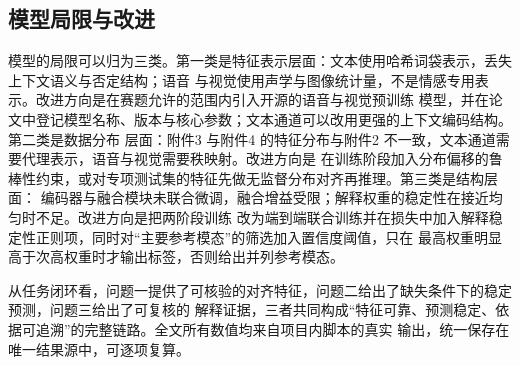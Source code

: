 \documentclass[bwprint]{gmcmthesis}
\begin{document}
\subsection{模型局限与改进}

模型的局限可以归为三类。第一类是特征表示层面：文本使用哈希词袋表示，丢失上下文语义与否定结构；语音
与视觉使用声学与图像统计量，不是情感专用表示。改进方向是在赛题允许的范围内引入开源的语音与视觉预训练
模型，并在论文中登记模型名称、版本与核心参数；文本通道可以改用更强的上下文编码结构。第二类是数据分布
层面：附件3 与附件4 的特征分布与附件2 不一致，文本通道需要代理表示，语音与视觉需要秩映射。改进方向是
在训练阶段加入分布偏移的鲁棒性约束，或对专项测试集的特征先做无监督分布对齐再推理。第三类是结构层面：
编码器与融合模块未联合微调，融合增益受限；解释权重的稳定性在接近均匀时不足。改进方向是把两阶段训练
改为端到端联合训练并在损失中加入解释稳定性正则项，同时对“主要参考模态”的筛选加入置信度阈值，只在
最高权重明显高于次高权重时才输出标签，否则给出并列参考模态。

从任务闭环看，问题一提供了可核验的对齐特征，问题二给出了缺失条件下的稳定预测，问题三给出了可复核的
解释证据，三者共同构成“特征可靠、预测稳定、依据可追溯”的完整链路。全文所有数值均来自项目内脚本的真实
输出，统一保存在唯一结果源中，可逐项复算。
\end{document}
